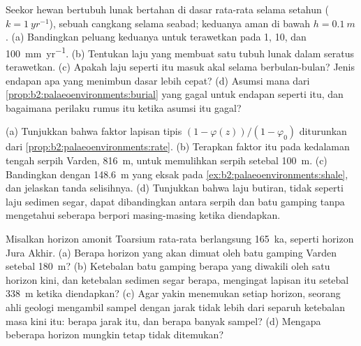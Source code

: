 \begin{exercise}[$\star\star\star$]\label{exo:b2:palaeoenvironments:10}
Seekor hewan bertubuh lunak bertahan di dasar rata-rata selama setahun ($k = \qty{1}{yr^{-1}}$), sebuah
cangkang selama seabad; keduanya aman di bawah $h = \qty{0.1}{m}$. (a) Bandingkan peluang
keduanya untuk terawetkan pada 1, 10, dan \qty{100}{mm.yr^{-1}}. (b) Tentukan laju yang membuat satu tubuh lunak dalam
seratus terawetkan. (c) Apakah laju seperti itu masuk akal selama berbulan-bulan? Jenis endapan apa yang menimbun
dasar lebih cepat? (d) Asumsi mana dari \cref{prop:b2:palaeoenvironments:burial} yang gagal untuk
endapan seperti itu, dan bagaimana perilaku rumus itu ketika asumsi itu gagal?
\end{exercise}

\begin{exercise}[$\star\star\star$]\label{exo:b2:palaeoenvironments:11}
(a) Tunjukkan bahwa faktor lapisan tipis $(1 - \varphi(z))/(1 - \varphi_0)$ diturunkan dari
\cref{prop:b2:palaeoenvironments:rate}. (b) Terapkan faktor itu pada kedalaman tengah serpih Varden,
\qty{816}{m}, untuk memulihkan serpih setebal \qty{100}{m}. (c) Bandingkan dengan \qty{148.6}{m} yang eksak pada
\cref{ex:b2:palaeoenvironments:shale}, dan jelaskan tanda selisihnya. (d) Tunjukkan bahwa
laju butiran, tidak seperti laju sedimen segar, dapat dibandingkan antara serpih dan batu gamping
tanpa mengetahui seberapa berpori masing-masing ketika diendapkan.
\end{exercise}

\begin{exercise}[$\star\star\star$]\label{exo:b2:palaeoenvironments:12}
Misalkan horizon amonit Toarsium rata-rata berlangsung \qty{165}{ka}, seperti horizon Jura Akhir.
(a) Berapa horizon yang akan dimuat oleh batu gamping Varden setebal \qty{180}{m}? (b) Ketebalan
batu gamping berapa yang diwakili oleh satu horizon kini, dan ketebalan sedimen segar berapa, mengingat
lapisan itu setebal \qty{338}{m} ketika diendapkan? (c) Agar yakin menemukan setiap horizon, seorang
ahli geologi mengambil sampel dengan jarak tidak lebih dari separuh ketebalan masa kini itu: berapa jarak itu, dan berapa banyak
sampel? (d) Mengapa beberapa horizon mungkin tetap tidak ditemukan?
\end{exercise}

